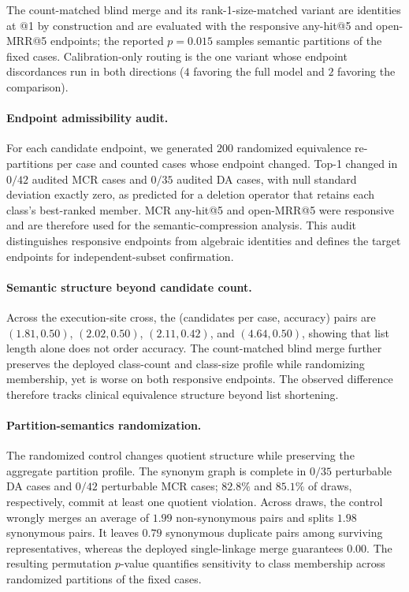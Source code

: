 \documentclass[letterpaper]{article}
\begin{document}
The count-matched blind merge and its rank-1-size-matched variant are identities at @1 by construction and are evaluated with the responsive any-hit@5 and open-MRR@5 endpoints; the reported $p=0.015$ samples semantic partitions of the fixed cases.
Calibration-only routing is the one variant whose endpoint discordances run in both directions ($4$ favoring the full model and $2$ favoring the comparison).

\paragraph{Endpoint admissibility audit.}
For each candidate endpoint, we generated $200$ randomized equivalence re-partitions per case and counted cases whose endpoint changed.
Top-1 changed in $0/42$ audited MCR cases and $0/35$ audited DA cases, with null standard deviation exactly zero, as predicted for a deletion operator that retains each class's best-ranked member.
MCR any-hit@5 and open-MRR@5 were responsive and are therefore used for the semantic-compression analysis.
This audit distinguishes responsive endpoints from algebraic identities and defines the target endpoints for independent-subset confirmation.

\paragraph{Semantic structure beyond candidate count.}
Across the execution-site cross, the (candidates per case, accuracy) pairs are $(1.81,0.50)$, $(2.02,0.50)$, $(2.11,0.42)$, and $(4.64,0.50)$, showing that list length alone does not order accuracy.
The count-matched blind merge further preserves the deployed class-count and class-size profile while randomizing membership, yet is worse on both responsive endpoints.
The observed difference therefore tracks clinical equivalence structure beyond list shortening.

\paragraph{Partition-semantics randomization.}
The randomized control changes quotient structure while preserving the aggregate partition profile.
The synonym graph is complete in $0/35$ perturbable DA cases and $0/42$ perturbable MCR cases; $82.8\%$ and $85.1\%$ of draws, respectively, commit at least one quotient violation.
Across draws, the control wrongly merges an average of $1.99$ non-synonymous pairs and splits $1.98$ synonymous pairs.
It leaves $0.79$ synonymous duplicate pairs among surviving representatives, whereas the deployed single-linkage merge guarantees $0.00$.
The resulting permutation $p$-value quantifies sensitivity to class membership across randomized partitions of the fixed cases.
\end{document}
